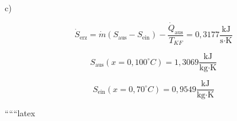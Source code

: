 c) 

\[
\dot{S}_{\text{erz}} = \dot{m} (S_{\text{aus}} - S_{\text{ein}}) - \frac{\dot{Q}_{\text{aus}}}{T_{KF}} = 0,3177 \frac{\text{kJ}}{\text{s} \cdot \text{K}}
\]

\[
S_{\text{aus}} (x = 0, 100^\circ C) = 1,3069 \frac{\text{kJ}}{\text{kg} \cdot \text{K}}
\]

\[
S_{\text{ein}} (x = 0, 70^\circ C) = 0,9549 \frac{\text{kJ}}{\text{kg} \cdot \text{K}}
\]

``````latex